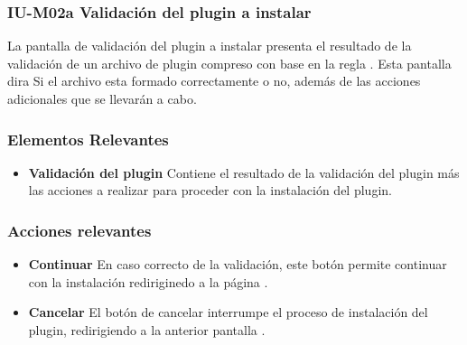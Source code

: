 
\subsubsection{IU-M02a Validación del plugin a instalar}

 La pantalla de validación del plugin a instalar presenta el resultado de la validación de un
 archivo de plugin compreso con base en la regla . Esta pantalla dira Si el archivo
 esta formado correctamente o no, además de las acciones adicionales que se llevarán a cabo.


\subsubsection{Elementos Relevantes}

    \begin{itemize}
    \item {\bf Validación del plugin}
        Contiene el resultado de la validación del plugin más las acciones
        a realizar para proceder con la instalación del plugin.
        
    \end{itemize}

\subsubsection{Acciones relevantes}

    \begin{itemize}
    \item {\bf Continuar}
        En caso correcto de la validación, este botón permite continuar con la instalación
        rediriginedo a la página .

    \item {\bf Cancelar}
        El botón de cancelar interrumpe el proceso de instalación del plugin, redirigiendo
        a la anterior pantalla .
    \end{itemize}

\clearpage
